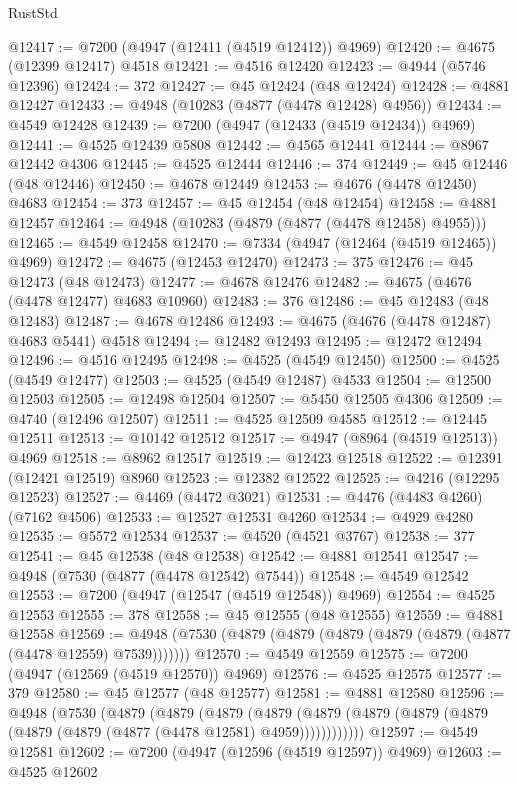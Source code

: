 \begin{lexlean}{RustStd}
\begin{coremodule}
@12417 := @7200 (@4947 (@12411 (@4519 @12412)) @4969)
@12420 := @4675 (@12399 @12417) @4518
@12421 := @4516 @12420
@12423 := @4944 (@5746 @12396)
@12424 := 372
@12427 := @45 @12424 (@48 @12424)
@12428 := @4881 @12427
@12433 := @4948 (@10283 (@4877 (@4478 @12428) @4956))
@12434 := @4549 @12428
@12439 := @7200 (@4947 (@12433 (@4519 @12434)) @4969)
@12441 := @4525 @12439 @5808
@12442 := @4565 @12441
@12444 := @8967 @12442 @4306
@12445 := @4525 @12444
@12446 := 374
@12449 := @45 @12446 (@48 @12446)
@12450 := @4678 @12449
@12453 := @4676 (@4478 @12450) @4683
@12454 := 373
@12457 := @45 @12454 (@48 @12454)
@12458 := @4881 @12457
@12464 := @4948 (@10283 (@4879 (@4877 (@4478 @12458) @4955)))
@12465 := @4549 @12458
@12470 := @7334 (@4947 (@12464 (@4519 @12465)) @4969)
@12472 := @4675 (@12453 @12470)
@12473 := 375
@12476 := @45 @12473 (@48 @12473)
@12477 := @4678 @12476
@12482 := @4675 (@4676 (@4478 @12477) @4683 @10960)
@12483 := 376
@12486 := @45 @12483 (@48 @12483)
@12487 := @4678 @12486
@12493 := @4675 (@4676 (@4478 @12487) @4683 @5441) @4518
@12494 := @12482 @12493
@12495 := @12472 @12494
@12496 := @4516 @12495
@12498 := @4525 (@4549 @12450)
@12500 := @4525 (@4549 @12477)
@12503 := @4525 (@4549 @12487) @4533
@12504 := @12500 @12503
@12505 := @12498 @12504
@12507 := @5450 @12505 @4306
@12509 := @4740 (@12496 @12507)
@12511 := @4525 @12509 @4585
@12512 := @12445 @12511
@12513 := @10142 @12512
@12517 := @4947 (@8964 (@4519 @12513)) @4969
@12518 := @8962 @12517
@12519 := @12423 @12518
@12522 := @12391 (@12421 @12519) @8960
@12523 := @12382 @12522
@12525 := @4216 (@12295 @12523)
@12527 := @4469 (@4472 @3021)
@12531 := @4476 (@4483 @4260) (@7162 @4506)
@12533 := @12527 @12531 @4260
@12534 := @4929 @4280
@12535 := @5572 @12534
@12537 := @4520 (@4521 @3767)
@12538 := 377
@12541 := @45 @12538 (@48 @12538)
@12542 := @4881 @12541
@12547 := @4948 (@7530 (@4877 (@4478 @12542) @7544))
@12548 := @4549 @12542
@12553 := @7200 (@4947 (@12547 (@4519 @12548)) @4969)
@12554 := @4525 @12553
@12555 := 378
@12558 := @45 @12555 (@48 @12555)
@12559 := @4881 @12558
@12569 := @4948 (@7530 (@4879 (@4879 (@4879 (@4879 (@4879 (@4877 (@4478 @12559) @7539)))))))
@12570 := @4549 @12559
@12575 := @7200 (@4947 (@12569 (@4519 @12570)) @4969)
@12576 := @4525 @12575
@12577 := 379
@12580 := @45 @12577 (@48 @12577)
@12581 := @4881 @12580
@12596 := @4948
    (@7530
      (@4879
        (@4879
          (@4879
            (@4879 (@4879 (@4879 (@4879 (@4879 (@4879 (@4879 (@4877 (@4478 @12581) @4959))))))))))))
@12597 := @4549 @12581
@12602 := @7200 (@4947 (@12596 (@4519 @12597)) @4969)
@12603 := @4525 @12602

\end{coremodule}
\end{lexlean}
